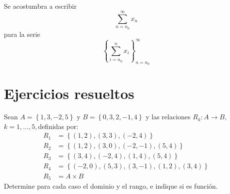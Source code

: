 \paragraph{}

Se acostumbra a escribir
\[
\sum_{n=n_{0}}^{\infty}x_{n}%
\]
para la serie
\[
\left\{  \sum_{i=n_{0}}^{n}x_{i}\right\}  _{n=n_{0}}^{\infty}%
\]




\section{Ejercicios resueltos}

\begin{example}
Sean $A=\left\{  1,3,-2,5\right\}  $ y $B=\left\{  0,3,2,-1,4\right\}  $ y las
relaciones $R_{k}:A\longrightarrow B,$ $k=1,\ldots,5,$definidas por:
\begin{align*}
R_{1}  &  =\left\{  \left(  1,2\right)  ,\left(  3,3\right)  ,\left(
-2,4\right)  \right\} \\
R_{2}  &  =\left\{  \left(  1,2\right)  ,\left(  3,0\right)  ,\left(
-2,-1\right)  ,\left(  5,4\right)  \right\} \\
R_{3}  &  =\left\{  \left(  3,4\right)  ,\left(  -2,4\right)  ,\left(
1,4\right)  ,\left(  5,4\right)  \right\} \\
R_{4}  &  =\left\{  \left(  -2,0\right)  ,\left(  5,3\right)  ,\left(
3,-1\right)  ,\left(  1,2\right)  ,\left(  3,4\right)  \right\} \\
R_{5}  &  =A\times B
\end{align*}
Determine para cada caso el dominio y el rango, e indique si es funci\'{o}n.
\end{example}

